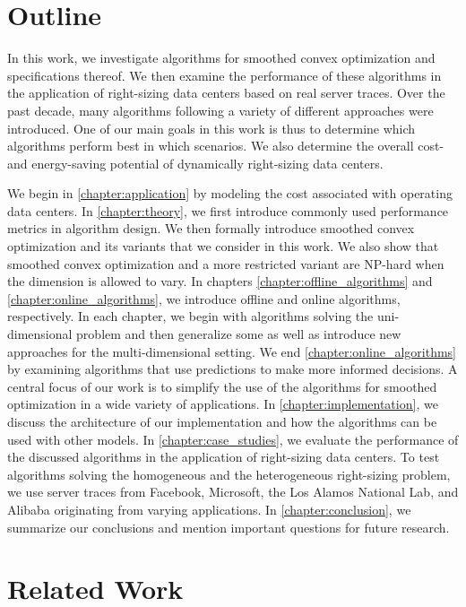 \section{Outline}

In this work, we investigate algorithms for smoothed convex optimization and specifications thereof. We then examine the performance of these algorithms in the application of right-sizing data centers based on real server traces. Over the past decade, many algorithms following a variety of different approaches were introduced. One of our main goals in this work is thus to determine which algorithms perform best in which scenarios. We also determine the overall cost- and energy-saving potential of dynamically right-sizing data centers.

We begin in \autoref{chapter:application} by modeling the cost associated with operating data centers. In \autoref{chapter:theory}, we first introduce commonly used performance metrics in algorithm design. We then formally introduce smoothed convex optimization and its variants that we consider in this work. We also show that smoothed convex optimization and a more restricted variant are NP-hard when the dimension is allowed to vary. In chapters \ref{chapter:offline_algorithms} and \ref{chapter:online_algorithms}, we introduce offline and online algorithms, respectively. In each chapter, we begin with algorithms solving the uni-dimensional problem and then generalize some as well as introduce new approaches for the multi-dimensional setting. We end \autoref{chapter:online_algorithms} by examining algorithms that use predictions to make more informed decisions. A central focus of our work is to simplify the use of the algorithms for smoothed optimization in a wide variety of applications. In \autoref{chapter:implementation}, we discuss the architecture of our implementation and how the algorithms can be used with other models. In \autoref{chapter:case_studies}, we evaluate the performance of the discussed algorithms in the application of right-sizing data centers. To test algorithms solving the homogeneous and the heterogeneous right-sizing problem, we use server traces from Facebook, Microsoft, the Los Alamos National Lab, and Alibaba originating from varying applications. In \autoref{chapter:conclusion}, we summarize our conclusions and mention important questions for future research.

\section{Related Work}

